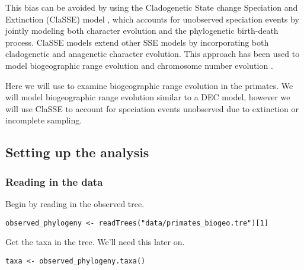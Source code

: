 This bias can be avoided by using the 
Cladogenetic State change Speciation and Extinction
(ClaSSE) model \citep{Goldberg2012},
which accounts for unobserved speciation events
by jointly modeling both character evolution
and the phylogenetic birth-death process.
ClaSSE models extend other SSE models by incorporating both cladogenetic 
and anagenetic character evolution.
This approach has been used to model biogeographic range evolution \citep{Goldberg2011}
and chromosome number evolution \citep{Freyman2017}.

Here we will use \RevBayes to examine biogeographic range evolution in the primates.
We will model biogeographic range evolution similar to a DEC model, 
however we will use ClaSSE to account for speciation events unobserved due 
to extinction or incomplete sampling.

\subsection{Setting up the analysis}

\subsubsection{Reading in the data}

Begin by reading in the observed tree.
{\tt \begin{snugshade*}
\begin{lstlisting}
observed_phylogeny <- readTrees("data/primates_biogeo.tre")[1]
\end{lstlisting}
\end{snugshade*}}

Get the taxa in the tree. We'll need this later on.
{\tt \begin{snugshade*}
\begin{lstlisting}
taxa <- observed_phylogeny.taxa()
\end{lstlisting}
\end{snugshade*}}

